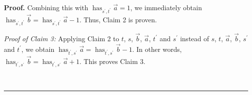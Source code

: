 \documentclass[numbers=enddot,12pt,final,onecolumn,notitlepage,abstracton]{scrartcl}%
\theoremstyle{definition}
\newenvironment{proof}[1][Proof]{\noindent\textbf{#1.} }{\ \rule{0.5em}{0.5em}}
\begin{document}
\begin{proof}
Combining this with $\operatorname*{has}\nolimits_{s^{\prime},t^{\prime}%
}\overrightarrow{a}=1$, we immediately obtain $\operatorname*{has}%
\nolimits_{s^{\prime},t^{\prime}}\overrightarrow{b}=\operatorname*{has}%
\nolimits_{s^{\prime},t^{\prime}}\overrightarrow{a}-1$. Thus, Claim 2 is proven.

\textit{Proof of Claim 3:} Applying Claim 2 to $t$, $s$, $\overrightarrow{b}$,
$\overrightarrow{a}$, $t^{\prime}$ and $s^{\prime}$ instead of $s$, $t$,
$\overrightarrow{a}$, $\overrightarrow{b}$, $s^{\prime}$ and $t^{\prime}$, we
obtain $\operatorname*{has}\nolimits_{t^{\prime},s^{\prime}}\overrightarrow{a}%
=\operatorname*{has}\nolimits_{t^{\prime},s^{\prime}}\overrightarrow{b}-1$. In
other words, $\operatorname*{has}\nolimits_{t^{\prime},s^{\prime}%
}\overrightarrow{b}=\operatorname*{has}\nolimits_{t^{\prime},s^{\prime}%
}\overrightarrow{a}+1$. This proves Claim 3.


\end{proof}
\end{document}
